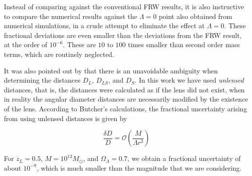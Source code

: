 Instead of comparing against the conventional FRW results, it is also instructive to compare the numerical results against the $\Lambda = 0$ point also obtained from numerical simulations, in a crude attempt to eliminate the effect at $\Lambda = 0$. These fractional deviations are even smaller than the deviations from the FRW result, at the order of $10^{-6}$. These are $10$ to $100$ times smaller than second order mass terms, which are routinely neglected. 

It was also pointed out by \citet{butcher2016no} that there is an unavoidable ambiguity when determining the distances $D_L$, $D_{LS}$, and $D_S$. In this work we have used \emph{unlensed} distances, that is, the distances were calculated as if the lens did not exist, when in reality the angular diameter distances are necessarily modified by the existence of the lens. According to Butcher's calculations, the fractional uncertainty arising from using unlensed distances is given by

\begin{equation}
  \frac{\delta D}{D} = \mathcal{O}\left (\frac{M}{\Lambda r^3} \right )
\end{equation}

For $z_L = 0.5$, $M = 10^{13} M_{\odot}$, and $\Omega_{\Lambda} = 0.7$, we obtain a fractional uncertainty of about $10^{-9}$, which is much smaller than the magnitude that we are considering. 
